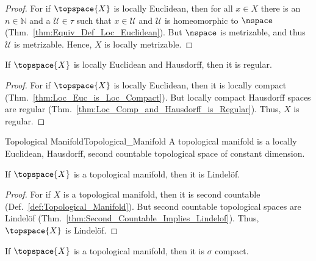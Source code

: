 \documentclass{article}                                                        %
\begin{document}
            \begin{proof}
                For if $\topspace{X}$ is locally Euclidean, then for all $x\in{X}$
                there is an $n\in\mathbb{N}$ and a $\mathcal{U}\in\tau$ such that
                $x\in\mathcal{U}$ and $\mathcal{U}$ is homeomorphic to
                $\nspace$ (Thm.~\ref{thm:Equiv_Def_Loc_Euclidean}). But
                $\nspace$ is metrizable, and thus $\mathcal{U}$ is metrizable.
                Hence, $X$ is locally metrizable.
            \end{proof}
            \begin{theorem}
                \label{thm:Loc_Euc_Haus_is_Regular}%
                If $\topspace{X}$ is locally Euclidean and Hausdorff, then it is
                regular.
            \end{theorem}
            \begin{proof}
                For if $\topspace{X}$ is locally Euclidean, then it is locally
                compact (Thm.~\ref{thm:Loc_Euc_is_Loc_Compact}). But locally
                compact Hausdorff spaces are regular
                (Thm.~\ref{thm:Loc_Comp_and_Hausdorff_is_Regular}). Thus,
                $X$ is regular.
            \end{proof}
            \begin{fdefinition}{Topological Manifold}{Topological_Manifold}
                A topological manifold is a locally Euclidean, Hausdorff, second
                countable topological space of constant dimension.
            \end{fdefinition}
            \begin{theorem}
                \label{thm:Manifolds_are_Lindelof}%
                If $\topspace{X}$ is a topological manifold, then it is
                Lindel\"{o}f.
            \end{theorem}
            \begin{proof}
                For if $X$ is a topological manifold, then it is second countable
                (Def.~\ref{def:Topological_Manifold}). But second countable
                topological spaces are Lindel\"{o}f
                (Thm.~\ref{thm:Second_Countable_Implies_Lindelof}). Thus,
                $\topspace{X}$ is Lindel\"{o}f.
            \end{proof}
            \begin{theorem}
                If $\topspace{X}$ is a topological manifold, then it is $\sigma$
                compact.
            \end{theorem}
\end{document}
